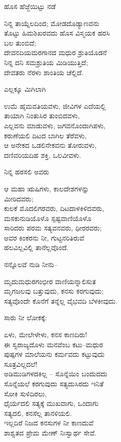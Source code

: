 ಹೊಸ ಹೆಜ್ಜೆಯಿಟ್ಟು ನಡೆ

\begin{myquote}
ನಿನ್ನ ತಾಯ್ನೆಲದಿಂದ; ಮೋಡದೊಡ್ಯಾಣವನು\\ತೊಟ್ಟು ಹಿಮಶಿಖರವದು ಹೊಸ ವಿಸ್ಮಯಕ ಹರಸಿ\\ಬಲ ತುಂಬಿದೆ;\\ದೇವನದಿಯಮರಗಾನದ ಮಧುರ ಶ್ರುತಿಯೊಡನೆ\\ನಿನ್ನ ದನಿ ಸಮಶ್ರುತಿಯ ಮಿಡಿಯುತ್ತಿದೆ;\\ದೇವತರು ನೆರಳು ಶಾಂತಿಯ ಚೆಲ್ಲಿದೆ.
\end{myquote}

ಎಲ್ಲಕ್ಕೂ ಮಿಗಿಲಾಗಿ

\begin{myquote}
ಉಮೆ ಹೈಮವತಿಯವಳು, ಜೀವಿಗಳ ಎದೆಯಲ್ಲಿ\\ತಾಯಾಗಿ ನಿಂತುಸಿರ ತುಂಬಿದವಳು,\\ಎಲ್ಲವನು ಮಾಡುವಳು, ಜಗವನೊಂದಾಗಿಪಳು,\\ಕರುಣೆಯಲಿ ದಿಟದ ಬಾಗಿಲ ತೆರೆವಳು,\\ಆ ಅನೇಕದ ಒಡಲಿನೇಕವನು ತೋರುವಳು,\\ದಣಿವರಿಯದಿಹ ಶಕ್ತಿ, ಒಲವೀವಳು.
\end{myquote}

ನಿನ್ನ ಹರಸಲಿ ಅವರು

\begin{myquote}
ಆ ಮಹಾ ಋಷಿಗಳು, ಕಾಲದೇಶಗಳನ್ನು\\ಮೀರಿದವರು;\\ಕುಲಕೆ ಮೊದಲಿಗರವರು, ದಿಟದಾಳಕಿಳಿದವರು,\\ಮಸಕುನುಡಿಯೊಳೊ ಸ್ಪಷ್ಟವಾಣಿಯೊಳೊ\\ಸಾರಿದರು ಪರಮ ಸತ್ಯವನವರು, ಧೀರರವರು;\\ಅವರ ಕಿಂಕರನು ನೀ, ಗುಟ್ಟನರಿತಿರುವೆ\\ಹಲವಿಲ್ಲವಿಲ್ಲಿ ತಾನೆಲ್ಲವೊಂದೆ.
\end{myquote}

ನನ್ನೊಲವೆ ನುಡಿ ನೀನು–

\begin{myquote}
ಮೃದುಮಧುರಗಂಭೀರ ವಾಣಿಯನ್ನಾಲಿಸುತ\\ಮೃಗಜಲವು ಬತ್ತುವುದು, ಕನಸು ಕರಗುವುದು;\\ಸತ್ಯವೊಂದೇ ಕೊನೆಗೆ ತನ್ನೆಲ್ಲ ವೈಭವದಿ ಬೆಳಕೀವುದು.
\end{myquote}

ಸಾರು ನೀ ಲೋಕಕ್ಕೆ:

\begin{myquote}
ಏಳು, ಮೇಲೇಳೇಳು, ಕನಸ ಕಾಣದಿರು!\\ಈ ಸ್ವರಾಜ್ಯದೊಳು ಮನವೆಂಬ ಕಟು–ಮಧುರ\\ಪುಷ್ಪಗಳ ಮಾಲೆಯನು ಕರ್ಮವದು ಕಟ್ಟುವುದು\\ಸೂತ್ರವಿಲ್ಲದಲೆ!\\ಅಡಿಮುಡಿಗಳದಕಿಲ್ಲ – ಸೊನ್ನೆಯಿಂ ಬಂದುದದು\\ಸೊನ್ನೆಯಲೆ ಕರಗುವುದು ಸತ್ಯದುಸಿರದು ಇನಿತೆ\\ಸೋಕಿ ಸುಳಿದಿರಲು,\\ಧೈರ್ಯದಲಿ ಸತ್ಯಕ್ಕೆ ಮುಖವಾಗು, ಒಂದಾಗು\\ಸತ್ಯದಲಿ, ಕನಸೆಲ್ಲ ತಾನಳಿಯಲಿ.\\ಇಲ್ಲದಿರೆ ನಿಜದ ಕನಸುಗಳ ನೀ ಕಾಣದುವೆ\\ಶಾಶ್ವತದ ಪ್ರೇಮ ಮೇಣ್ ನಿಃಸ್ವಾರ್ಥ ಸೇವೆ.
\end{myquote}

